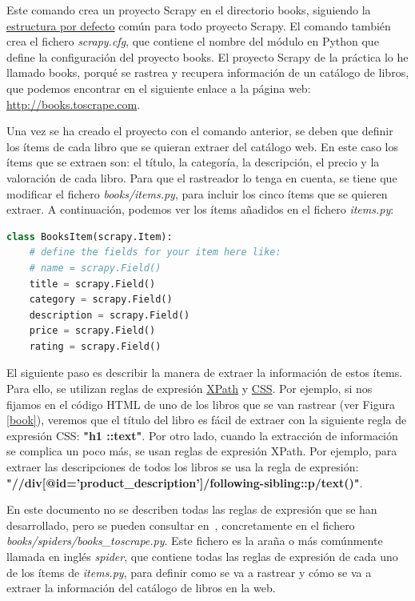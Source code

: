 \documentclass{uimppracticas}
\begin{document}
Este comando crea un proyecto Scrapy en el directorio books, siguiendo la \href{https://docs.scrapy.org/en/latest/topics/commands.html#default-structure-of-scrapy-projects}{estructura por defecto} común para todo proyecto Scrapy. El comando también crea el fichero \textit{scrapy.cfg}, que contiene el nombre del módulo en Python que define la configuración del proyecto books. El proyecto Scrapy de la práctica lo he llamado books, porqué se rastrea y recupera información de un catálogo de libros, que podemos encontrar en el siguiente enlace a la página web: \url{http://books.toscrape.com}.

Una vez se ha creado el proyecto con el comando anterior, se deben que definir los ítems de cada libro que se quieran extraer del catálogo web. En este caso los ítems que se extraen son: el título, la categoría, la descripción, el precio y la valoración de cada libro. Para que el rastreador lo tenga en cuenta, se tiene que modificar el fichero \textit{books/items.py}, para incluir los cinco ítems que se quieren extraer. A continuación, podemos ver los ítems añadidos en el fichero \textit{items.py}:

\begin{lstlisting}[language=python]
class BooksItem(scrapy.Item):
	# define the fields for your item here like:
	# name = scrapy.Field()
	title = scrapy.Field()
	category = scrapy.Field()
	description = scrapy.Field()
	price = scrapy.Field()
	rating = scrapy.Field()
\end{lstlisting}

El siguiente paso es describir la manera de extraer la información de estos ítems. Para ello, se utilizan reglas de expresión \href{https://www.w3.org/TR/xpath/all/}{XPath} y \href{https://www.w3.org/TR/selectors/}{CSS}. Por ejemplo, si nos fijamos en el código HTML de uno de los libros que se van rastrear (ver Figura \ref{book}), veremos que el título del libro es fácil de extraer con la siguiente regla de expresión CSS: \textbf{"h1 ::text"}. Por otro lado, cuando la extracción de información se complica un poco más, se usan reglas de expresión XPath. Por ejemplo, para extraer las descripciones de todos los libros se usa la regla de expresión: \textbf{"//div[@id='product\_description']/following-sibling::p/text()"}. 

En este documento no se describen todas las reglas de expresión que se han desarrollado, pero se pueden consultar en~\cite{GitHubRepo}, concretamente en el fichero \textit{books/spiders/books\_toscrape.py}. Este fichero es la araña o más comúnmente llamada en inglés \textit{spider}, que contiene todas las reglas de expresión de cada uno de los ítems de \textit{items.py}, para definir como se va a rastrear y cómo se va a extraer la información del catálogo de libros en la web.
\end{document}
